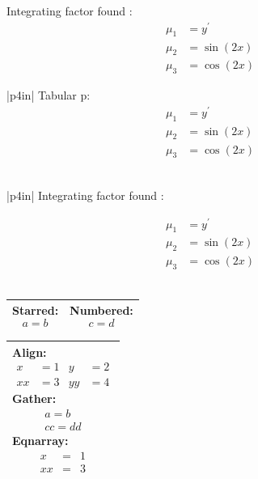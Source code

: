 \documentclass{article}
\begin{document}
Integrating factor found :
\[
\begin{aligned}
\mu_1 &=y^{\prime}\\
\mu_2 &=\sin \left(2 x \right)\\
\mu_3 &=\cos \left(2 x \right)
\end{aligned}
\]

\begin{tabular}{|p{4in}|}
Tabular p:
\[
\begin{aligned}
\mu_1 &=y^{\prime}\\
\mu_2 &=\sin \left(2 x \right)\\
\mu_3 &=\cos \left(2 x \right)
\end{aligned}
\]
\\\hline
\end{tabular}

\begin{longtable}{|p{4in}|}
Integrating factor found :

\[
\begin{aligned}
\mu_1 &= y^{\prime} \\
\mu_2 &= \sin\left(2x\right) \\
\mu_3 &= \cos\left(2x\right)
\end{aligned}
\]
\\\hline
\end{longtable}

\begin{tabular}{|m{2in}|b{2in}|}
Starred:
\begin{equation*}
a = b
\end{equation*}
&
Numbered:
\begin{equation}
c = d
\end{equation}
\\\hline
\end{tabular}

\begin{tabular}{|p{4in}|}
Align:
{\begin{align*}
x &= 1 & y &= 2 \\
xx &= 3 & yy &= 4
\end{align*}}
Gather:
\begin{gather*}
a = b \\
cc = dd
\end{gather*}
Eqnarray:
\begin{eqnarray*}
x &=& 1 \\
xx &=& 3
\end{eqnarray*}
\\\hline
\end{tabular}
\end{document}
